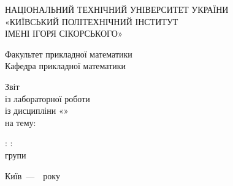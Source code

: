 
\thispagestyle{empty}
\setlength{\parindent}{0cm}

\begin{titlepage}
    \centering
    \vspace{2cm} 
    
    НАЦІОНАЛЬНИЙ ТЕХНІЧНИЙ УНІВЕРСИТЕТ УКРАЇНИ \\
    «КИЇВСЬКИЙ ПОЛІТЕХНІЧНИЙ ІНСТИТУТ \\
    ІМЕНІ ІГОРЯ СІКОРСЬКОГО»
        
    \begin{center}
        Факультет прикладної математики \\
        Кафедра прикладної математики
    \end{center}
    
    \vspace{2cm}
    
    \begin{center}
        Звіт \\
        із лабораторної роботи \\
        із дисципліни «\reportCourse» \\
        на тему: \\
        \reportTitle
    \end{center}
    
    \vspace{1.5cm}
    
    \begin{flushleft}
        \authorMake: \hfill \supervisorReviewed: \\
        \authorPerformed групи \reportAuthorGroup \hfill \supervisorRegalia \\
        \reportAuthor \hfill \supervisorFio
    \end{flushleft}
        
    \vfill
    \begin{center}
    {Київ~---~\YearOfDefence\ року}
    \end{center}
\end{titlepage}

\clearpage %

\setcounter{page}{2} %

\setlength{\parindent}{1.25cm} %

\setlength{\belowdisplayskip}{14pt}
\setlength{\abovedisplayskip}{14pt}
\setlength{\belowdisplayshortskip}{14pt}
\setlength{\abovedisplayshortskip}{14pt}
